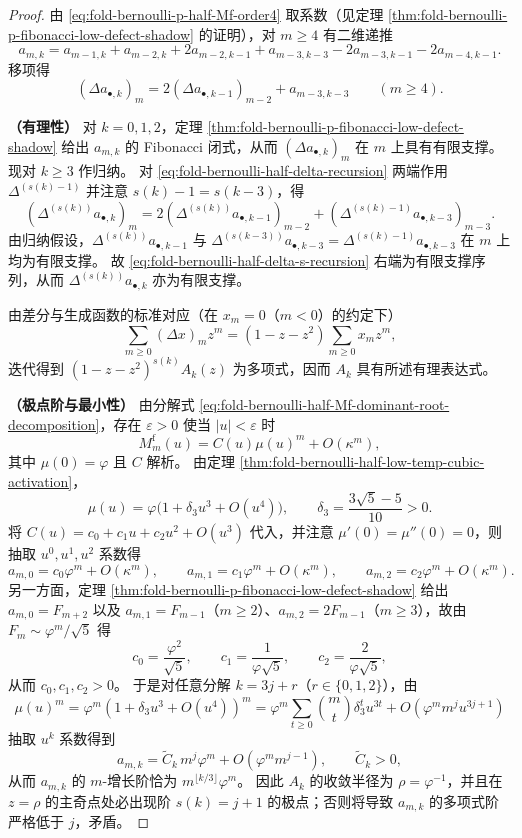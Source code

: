 \begin{proof}
由 \eqref{eq:fold-bernoulli-p-half-Mf-order4} 取系数（见定理 \ref{thm:fold-bernoulli-p-fibonacci-low-defect-shadow} 的证明），对 \(m\ge 4\) 有二维递推
\[
a_{m,k}=a_{m-1,k}+a_{m-2,k}+2a_{m-2,k-1}+a_{m-3,k-3}-2a_{m-3,k-1}-2a_{m-4,k-1}.
\]
移项得
\begin{equation}\label{eq:fold-bernoulli-half-delta-recursion}
(\Delta a_{\bullet,k})_m
=2(\Delta a_{\bullet,k-1})_{m-2}+a_{m-3,k-3}\qquad(m\ge 4).
\end{equation}

\textbf{（有理性）}
对 \(k=0,1,2\)，定理 \ref{thm:fold-bernoulli-p-fibonacci-low-defect-shadow} 给出 \(a_{m,k}\) 的 Fibonacci 闭式，从而 \((\Delta a_{\bullet,k})_m\) 在 \(m\) 上具有有限支撑。
现对 \(k\ge 3\) 作归纳。
对 \eqref{eq:fold-bernoulli-half-delta-recursion} 两端作用 \(\Delta^{(s(k)-1)}\) 并注意 \(s(k)-1=s(k-3)\)，得
\begin{equation}\label{eq:fold-bernoulli-half-delta-s-recursion}
(\Delta^{(s(k))}a_{\bullet,k})_m
=2(\Delta^{(s(k))}a_{\bullet,k-1})_{m-2}+(\Delta^{(s(k)-1)}a_{\bullet,k-3})_{m-3}.
\end{equation}
由归纳假设，\(\Delta^{(s(k))}a_{\bullet,k-1}\) 与 \(\Delta^{(s(k-3))}a_{\bullet,k-3}=\Delta^{(s(k)-1)}a_{\bullet,k-3}\) 在 \(m\) 上均为有限支撑。
故 \eqref{eq:fold-bernoulli-half-delta-s-recursion} 右端为有限支撑序列，从而 \(\Delta^{(s(k))}a_{\bullet,k}\) 亦为有限支撑。

由差分与生成函数的标准对应（在 \(x_m=0\)（\(m<0\)）的约定下）
\[
\sum_{m\ge 0}(\Delta x)_m z^m=(1-z-z^2)\sum_{m\ge 0}x_m z^m,
\]
迭代得到 \((1-z-z^2)^{s(k)}A_k(z)\) 为多项式，因而 \(A_k\) 具有所述有理表达式。

\textbf{（极点阶与最小性）}
由分解式 \eqref{eq:fold-bernoulli-half-Mf-dominant-root-decomposition}，存在 \(\varepsilon>0\) 使当 \(|u|<\varepsilon\) 时
\[
M_m^{\mathrm f}(u)=C(u)\mu(u)^m+O(\kappa^m),
\]
其中 \(\mu(0)=\varphi\) 且 \(C\) 解析。
由定理 \ref{thm:fold-bernoulli-half-low-temp-cubic-activation}，
\[
\mu(u)=\varphi\bigl(1+\delta_3u^3+O(u^4)\bigr),
\qquad
\delta_3=\frac{3\sqrt5-5}{10}>0.
\]
将
\(
C(u)=c_0+c_1u+c_2u^2+O(u^3)
\)
代入，并注意 \(\mu'(0)=\mu''(0)=0\)，则抽取 \(u^0,u^1,u^2\) 系数得
\[
a_{m,0}=c_0\varphi^m+O(\kappa^m),\qquad
a_{m,1}=c_1\varphi^m+O(\kappa^m),\qquad
a_{m,2}=c_2\varphi^m+O(\kappa^m).
\]
另一方面，定理 \ref{thm:fold-bernoulli-p-fibonacci-low-defect-shadow} 给出 \(a_{m,0}=F_{m+2}\) 以及 \(a_{m,1}=F_{m-1}\)（\(m\ge 2\)）、\(a_{m,2}=2F_{m-1}\)（\(m\ge 3\)），故由 \(F_m\sim \varphi^m/\sqrt5\) 得
\[
c_0=\frac{\varphi^2}{\sqrt5},\qquad c_1=\frac{1}{\varphi\sqrt5},\qquad c_2=\frac{2}{\varphi\sqrt5},
\]
从而 \(c_0,c_1,c_2>0\)。
于是对任意分解 \(k=3j+r\)（\(r\in\{0,1,2\}\)），由
\[
\mu(u)^m=\varphi^m(1+\delta_3u^3+O(u^4))^m
=\varphi^m\sum_{t\ge 0}\binom{m}{t}\delta_3^t u^{3t}+O(\varphi^m m^j u^{3j+1})
\]
抽取 \(u^k\) 系数得到
\[
a_{m,k}
=\widetilde C_k\,m^{j}\varphi^m+O(\varphi^m m^{j-1}),
\qquad \widetilde C_k>0,
\]
从而 \(a_{m,k}\) 的 \(m\)-增长阶恰为 \(m^{\lfloor k/3\rfloor}\varphi^m\)。
因此 \(A_k\) 的收敛半径为 \(\rho=\varphi^{-1}\)，并且在 \(z=\rho\) 的主奇点处必出现阶 \(s(k)=j+1\) 的极点；否则将导致 \(a_{m,k}\) 的多项式阶严格低于 \(j\)，矛盾。


\end{proof}
